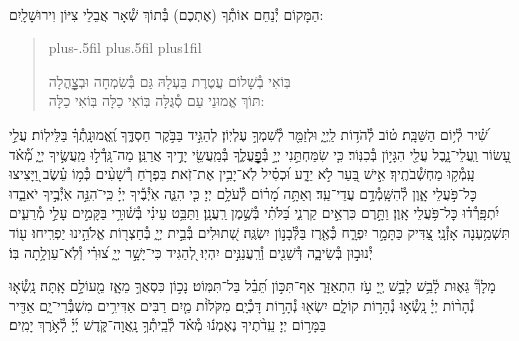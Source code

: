 \documentclass[twoside, openany, parskip=half, 11pt]{book}
\begin{document}
\begin{sometimes}

\\
הַמָּקוֹם יְ֯נַחֵם אוֹתְ֯ךָ (אֶתְכֶם) בְּ֯תוֹךְ שְׁ֯אָר אֲבֵלֵי צִיּוֹן וִירוּשָׁלָֽיִם:

\end{sometimes}

\begin{quote}
\leftskip=0pt plus-.5fil
\rightskip=0pt plus.5fil
\parfillskip=0pt plus1fil

בּֽוֹאִי בְ֯שָׁלוֹם עֲטֶרֶת בַּעְלָהּ \hfill
גַּם בְּ֯שִׂמְחָה וּבְצׇׇׇׇׇׇׇׇהֳלָה \\
תּוֹךְ אֱמוּנֵי עַם סְ֯גֻּלָּה \hfill
בּֽוֹאִי כַלָּה בּֽוֹאִי כַלָּה:

\lechadodi

\end{quote}


שִׁ֝֗יר לְ֯י֥וֹם הַשַּׁבָּֽת׃
ט֗וֹב לְ֯הֹד֥וֹת לַֽיְיָ֑ וּלְזַמֵּ֖ר לְ֯שִׁמְךָ֣ עֶלְיֽוֹן׃
לְהַגִּ֣יד בַּבֹּ֣קֶר חַסְדֶּ֑ךָ וֶֽ֝אֱמוּנָֽתְ֯ךָ֗ בַּלֵּילֽוֹת׃
עֲלֵ֣י עָ֭שׂוֹר וַֽעֲלֵי־נָ֑בֶל עֲלֵ֖י הִגָּי֣וֹן בְּ֯כִנּֽוֹר׃
כִּ֤י שִׂמַּחְתַּ֣נִי יְיָ֣ בְּ֯פׇׇׇׇׇׇׇׇׇׇׇׇׇׇֽעֳלֶ֑ךָ בְּ֯מַֽעֲשֵׂ֖י יָדֶ֣יךָ אֲרַנֵּֽן׃
מַה־גָּֽדְ֯ל֣וּ מַֽעֲשֶׂ֣יךָ יְיָ֑ מְ֝֯אֹ֗ד עָֽמְ֯ק֥וּ מַחְשְׁ֯בֹתֶֽיךָ׃
אִ֣ישׁ בַּ֭עַר לֹ֣א יֵדָ֑ע וּ֝כְסִ֗יל לֹֽא־יָבִ֥ין אֶת־זֹֽאת׃
בִּפְרֹ֤חַ רְ֯שָׁעִ֨ים כְּ֯מ֥וֹ עֵ֗שֶׂב וַ֭יָּצִיצוּ כׇּל־פֹּ֣עֲלֵי אָ֑וֶן לְ֯הִשָּֽׁמְ֯דָ֥ם עֲדֵי־עַֽד׃
וְאַתָּ֥ה מָ֝ר֗וֹם לְ֯עֹלָ֥ם יְיָ׃
כִּ֤י הִנֵּ֢ה אֹֽיְ֯בֶ֡יךָ יְיָ֗ כִּֽי־ֹהִנֵּ֣ה אֹֽיְ֯בֶ֣יךָ יֹאבֵ֑דוּ יִ֝תְפָּֽרְ֯ד֗וּ כׇּל־פֹּ֥עֲלֵי אָֽוֶן׃
וַתָּ֣רֶם כִּרְאֵ֣ים קַרְנִ֑י בַּ֝לֹּתִ֗י בְּ֯שֶׁ֣מֶן רַֽעֲנָֽן׃
וַתַּבֵּ֥ט עֵינִ֗י בְּ֯שׁ֫וּרָ֥י בַּקָּמִ֣ים עָלַ֣י מְ֯רֵעִ֑ים תִּשְׁמַ֥עְנָה אָזְ֯נָֽי׃
 צַ֭דִּיק כַּתָּמָ֣ר יִפְרָ֑ח כְּ֯אֶ֖רֶז בַּלְּ֯בָנ֣וֹן יִשְׂגֶּֽה׃
שְׁ֭תוּלִים בְּ֯בֵ֣ית יְיָ֑ בְּ֯חַצְר֖וֹת אֱלֹהֵ֣ינוּ יַפְרִֽיחוּ׃
ע֖וֹד יְ֯נוּב֣וּן בְּ֯שֵׂיבָ֑ה דְּ֯שֵׁנִ֖ים וְ֯רַֽעֲנַנִּ֣ים יִהְיֽוּ׃
לְ֭הַגִּיד כִּי־יָשָׁ֣ר יְיָ֑ צ֝וּרִ֗י וְ֯לֹֽא־עַוְלָ֥תָה בּֽוֹ׃

מָלָךְ֘ גֵּא֢וּת לָ֫בֵ֥שׁ לָבֵ֣שׁ יְ֖יָ עֹ֣ז הִתְאַזָּר֑ אַף־תִּכּ֣וֹן תֵּ֝בֵ֗ל בַּל־תִּמּֽוֹט׃
נָכ֣וֹן כִּסְאֲךָ֣ מֵאָ֑ז מֵ֖עוֹלָ֣ם אָֽתָּה׃
נָֽשְׂ֯א֤וּ נְ֯הָר֨וֹת יְיָ֗ נָֽשְׂ֯א֣וּ נְ֯הָר֣וֹת קוֹלָ֑ם יִשְׂא֖וּ נְ֯הָר֣וֹת דָּכְ֯יָֽם׃
 מִקֹּלוֹ֨ת מַ֤יִם רַבִּים אַדִּירִ֥ים מִשְׁבְּ֯רֵי־יָ֑ם אַדִּ֖יר בַּמָּר֣וֹם יְיָ׃
עֵֽדֹ֨תֶיךָ נֶאֶמְנ֬וּ מְ֯אֹ֗ד לְ֯בֵֽיתְ֯ךָ֥ נָֽאֲוָה־קֹּ֑דֶשׁ יְ֜יָ֗ לְ֯אֹ֣רֶךְ יָמִֽים׃

\mournerskaddish

\end{document}
